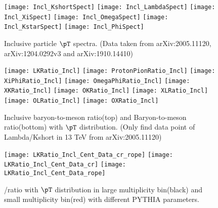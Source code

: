 \begin{figure}[ht]
        \begin{center}
                \texttt{[image: Incl\_KshortSpect]}
                \texttt{[image: Incl\_LambdaSpect]}
                \texttt{[image: Incl\_XiSpect]}
                \texttt{[image: Incl\_OmegaSpect]}
                \texttt{[image: Incl\_KstarSpect]}
                \texttt{[image: Incl\_PhiSpect]}
        \end{center}
	\caption{Inclusive particle $\pT$ spectra. (Data taken from arXiv:2005.11120, arXiv:1204.0292v3 and arXiv:1910.14410)}
        \label{fig:InclParSpect}
\end{figure}

\begin{figure}[ht]
        \begin{center}
                \texttt{[image: LKRatio\_Incl]}
                \texttt{[image: ProtonPionRatio\_Incl]}
                \texttt{[image: XiPhiRatio\_Incl]}
                \texttt{[image: OmegaPhiRatio\_Incl]}
                \texttt{[image: XKRatio\_Incl]}
                \texttt{[image: OKRatio\_Incl]}
                \texttt{[image: XLRatio\_Incl]}
                \texttt{[image: OLRatio\_Incl]}
                \texttt{[image: OXRatio\_Incl]}
        \end{center}
	\caption{Inclusive baryon-to-meson ratio(top) and Baryon-to-meson ratio(bottom) with $\pT$ distribution. (Only find data point of Lambda/Kshort in 13 TeV from arXiv:2005.11120)}
        \label{fig:InclParRatio}
\end{figure}

\begin{figure}[ht]
	\begin{center}
		\texttt{[image: LKRatio\_Incl\_Cent\_Data\_cr\_rope]}
		\texttt{[image: LKRatio\_Incl\_Cent\_Data\_cr]}
		\texttt{[image: LKRatio\_Incl\_Cent\_Data\_rope]}
	\end{center}
	\caption{\lmb/\kzero ratio with $\pT$ distribution in large multiplicity bin(black) and small multiplicity bin(red) with different PYTHIA parameters.}
	\label{fig:InclParRatioCent}
\end{figure}

